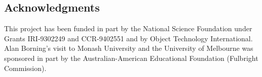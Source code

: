 \documentclass{uist96}
\begin{document}
\subsection*{Acknowledgments}

This project has been funded in part by the National Science Foundation
under Grants \mbox{IRI-9302249} and \mbox{CCR-9402551} and by Object
Technology International.  Alan Borning's visit to Monash University and
the University of Melbourne was sponsored in part by the
Australian-American Educational Foundation (Fulbright Commission).


\small


\end{document}

